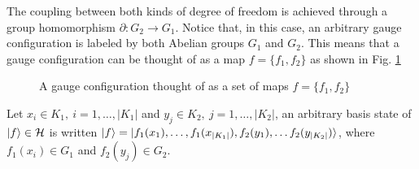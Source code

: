 \documentclass[titlepage,11pt]{article}
\theoremstyle{plain}%
\theoremstyle{definition}
\theoremstyle{remark}
\begin{document}
The coupling between both kinds of degree of freedom is achieved through a group homomorphism $\partial:G_2 \rightarrow G_1$. Notice that, in this case, an arbitrary gauge configuration is labeled by both Abelian groups $G_1$ and $G_2$. This means that a gauge configuration can be thought of as a map $f=\{f_1,f_2\}$ as shown in Fig. \ref{fig:2gch}
\begin{figure}[!h]
            \centering
\caption{\label{TCcomplex} A gauge configuration thought of as a set of maps $f=\{f_1,f_2\}$}\label{fig:2gch}
\end{figure}


Let \(x_i \in K_1, \ i=1, \dots, |K_1|\) and \(y_j \in K_2, \ j=1, \dots, |K_2|\), an arbitrary basis state of \(\ket{f} \in \mathcal{H}\) is written $\ket{f}=\ket{f_1(x_1),\dots, f_1(x_{|K_1|}),f_2(y_1),\dots f_2(y_{|K_2|})}$, where \(f_1(x_i) \in G_1\) and \(f_2(y_j) \in G_2\).
\end{document}
